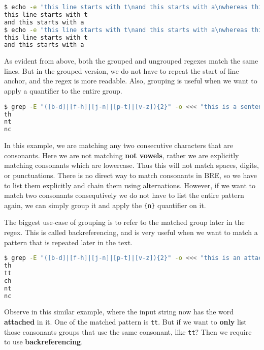 \begin{lstlisting}[language=bash]
$ echo -e "this line starts with t\nand this starts with a\nwhereas this line starts with w" | grep '^t\|^a'
this line starts with t
and this starts with a
$ echo -e "this line starts with t\nand this starts with a\nwhereas this line starts with w" | grep '^\(t\|a\)'
this line starts with t
and this starts with a
\end{lstlisting}

As evident from above, both the grouped and ungrouped regexes match the same lines.
But in the grouped version, we do not have to repeat the start of line anchor, and the regex is more readable.
Also, grouping is useful when we want to apply a quantifier to the entire group.


\begin{lstlisting}[language=bash]
$ grep -E "([b-d]|[f-h]|[j-n]|[p-t]|[v-z]){2}" -o <<< "this is a sentence"
th
nt
nc
\end{lstlisting}

In this example, we are matching any two consecutive characters that are consonants.
Here we are not matching \textbf{not vowels}, rather we are explicitly matching consonants which are lowercase. Thus this will not match spaces, digits, or punctuations.
There is no direct way to match consonants in BRE, so we have to list them explicitly and chain them using alternations.
However, if we want to match two consonants consequtively we do not have to list the entire pattern again, we can simply group it and apply the \lstinline|{n}| quantifier on it.

The biggest use-case of grouping is to refer to the matched group later in the regex. This is called backreferencing, and is very useful when we want to match a pattern that is repeated later in the text.

\begin{lstlisting}[language=bash]
$ grep -E "([b-d]|[f-h]|[j-n]|[p-t]|[v-z]){2}" -o <<< "this is an attached sentence"
th
tt
ch
nt
nc
\end{lstlisting}

Observe in this similar example, where the input string now has the word \textbf{attached} in it. One of the matched pattern is \lstinline|tt|. But if we want to \textbf{only} list those consonants groups that use the same consonant, like \lstinline|tt|? Then we require to use \textbf{backreferencing}.

